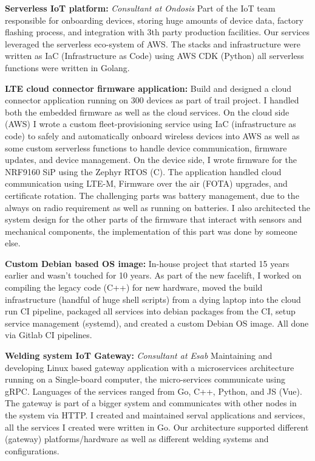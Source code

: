 

\SmallSep
\textbf{Serverless IoT platform:} \textit{Consultant at Ondosis} \newline
Part of the IoT team responsible for onboarding devices, storing huge amounts of device data, factory flashing process, and integration with 3th party
production facilities. \newline
Our services leveraged the serverless eco-system of AWS. The stacks and infrastructure were written as IaC (Infrastructure as Code) using AWS CDK (Python)
all serverless functions were written in Golang.
\SmallSep

\SmallSep
\textbf{LTE cloud connector firmware application:} 
Build and designed a cloud connector application running on 300 devices as part of trail project. 
I handled both the embedded firmware as well as the cloud services. 
On the cloud side (AWS) I wrote a custom fleet-provisioning service using IaC (infrastructure as code) to safely and automatically 
onboard wireless devices into AWS as well as some custom serverless functions to handle device communication, firmware updates, and device management.
\newline On the device side, I wrote firmware for the NRF9160 SiP using the Zephyr RTOS (C). The application handled cloud communication using 
LTE-M, Firmware over the air (FOTA) upgrades, and certificate rotation. 
The challenging parts was battery management, due to the always on radio requirement as well as running on batteries. 
I also architected the system design for the other parts of the firmware that interact with sensors and mechanical components, the implementation of this part was done by someone else.  
\SmallSep

\textbf{Custom Debian based OS image:} In-house project that started 15 years earlier and wasn't touched for 10 years. As part of the new facelift, I worked on compiling the legacy code (C++) for new hardware, moved the build infrastructure (handful of huge shell scripts) from a dying laptop into the cloud run CI pipeline, packaged all services into debian packages from the CI, setup service management (systemd), and created a custom Debian OS image. All done via Gitlab CI pipelines.
\SmallSep

\textbf{Welding system IoT Gateway:} \textit{Consultant at Esab} \newline
Maintaining and developing Linux based gateway application with a microservices architecture running on a Single-board computer, the micro-services communicate using gRPC. Languages of the services ranged from Go, C++, Python, and JS (Vue). The gateway is part of a bigger system and communicates with other nodes in the system via HTTP. I created and maintained serval applications and services, all the services I created were written in Go. Our architecture supported different (gateway) platforms/hardware as well as different welding systems and configurations.
\SmallSep 

